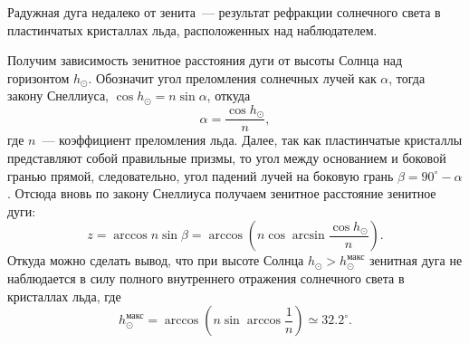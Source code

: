 Радужная дуга недалеко от зенита~--- результат рефракции солнечного света в пластинчатых кристаллах льда, расположенных над наблюдателем. 

Получим зависимость зенитное расстояния дуги от высоты Солнца над горизонтом $h_\odot$. Обозначит угол преломления солнечных лучей как $\alpha$, тогда закону Снеллиуса, $\cos h_\odot = n \sin \alpha$, откуда
\begin{equation*}
    \alpha = \frac{\cos h_\odot}{n},
\end{equation*}
где $n$~--- коэффициент преломления льда. Далее, так как пластинчатые кристаллы представляют собой правильные призмы, то угол между основанием и боковой гранью прямой, следовательно, угол падений лучей на боковую грань $\beta = 90^\circ - \alpha$. Отсюда вновь по закону Снеллиуса получаем зенитное расстояние зенитное дуги:
\begin{equation}
    z = \arccos n \sin \beta = \arccos \left( n \cos \arcsin \frac{\cos h_\odot}{n} \right).
\end{equation}
Откуда можно сделать вывод, что при высоте Солнца $h_\odot > h_\odot^{\text{макс}} $ зенитная дуга не наблюдается в силу полного внутреннего отражения солнечного света в кристаллах льда, где
\begin{equation}
    h_\odot^{\text{макс}} = \arccos \left( n \sin \arccos \frac{1}{n} \right) \simeq 32.2^\circ.
    \label{eq:h-max-circumzenithal-arc}
\end{equation}

